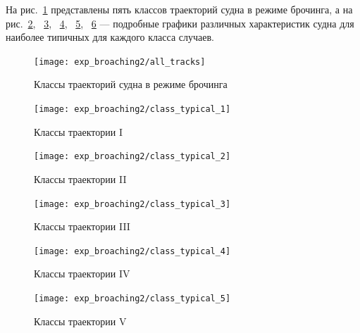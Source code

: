 На рис.~\ref{all_tracks} представлены пять классов траекторий судна в режиме брочинга,
а на рис.~\ref{broaching11}, ~\ref{broaching12}, ~\ref{broaching13}, ~\ref{broaching14}, ~\ref{broaching15} --- подробные графики различных характеристик судна для наиболее типичных для каждого класса случаев.

\begin{figure}
	\begin{center}
	\texttt{[image: exp\_broaching2/all\_tracks]}
	\end{center}
	\caption{Классы траекторий судна в режиме брочинга}
	\label{all_tracks}
\end{figure}



\begin{figure}
	\begin{center}	\texttt{[image: exp\_broaching2/class\_typical\_1]}	\end{center}
	\caption{Классы траектории I}	\label{broaching11}
\end{figure}

\begin{figure}
	\begin{center}	\texttt{[image: exp\_broaching2/class\_typical\_2]}	\end{center}
	\caption{Классы траектории II}	\label{broaching12}
\end{figure}

\begin{figure}
	\begin{center}	\texttt{[image: exp\_broaching2/class\_typical\_3]}	\end{center}
	\caption{Классы траектории III}	\label{broaching13}
\end{figure}

\begin{figure}
	\begin{center}	\texttt{[image: exp\_broaching2/class\_typical\_4]}	\end{center}
	\caption{Классы траектории IV}	\label{broaching14}
\end{figure}

\begin{figure}
	\begin{center}	\texttt{[image: exp\_broaching2/class\_typical\_5]}	\end{center}
	\caption{Классы траектории V}	\label{broaching15}
\end{figure}

